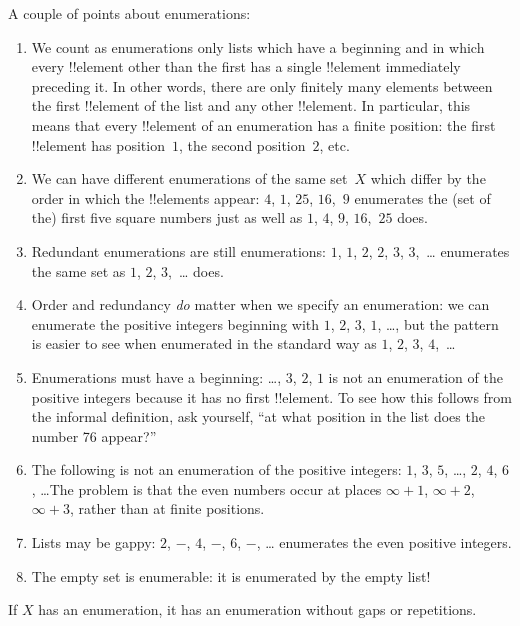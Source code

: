 \documentclass[../../../include/open-logic-section]{subfiles}
\begin{document}
\begin{explain}
A couple of points about enumerations:
\begin{enumerate}
\item We count as enumerations only lists which have a beginning and
  in which every !!{element} other than the first has a single
  !!{element} immediately preceding it.  In other words, there are
  only finitely many elements between the first !!{element} of the
  list and any other !!{element}. In particular, this means that every
  !!{element} of an enumeration has a finite position: the first
  !!{element} has position~$1$, the second position~$2$, etc.
\item We can have different enumerations of the same set~$X$ which
  differ by the order in which the !!{element}s appear: $4$, $1$,
  $25$, $16$,~$9$ enumerates the (set of the) first five square
  numbers just as well as $1$, $4$, $9$, $16$,~$25$ does.
\item Redundant enumerations are still enumerations: $1$, $1$, $2$,
  $2$, $3$, $3$,~\dots{} enumerates the same set as $1$, $2$,
  $3$,~\dots{} does.
\item Order and redundancy \emph{do} matter when we specify an
  enumeration: we can enumerate the positive integers beginning with
  $1$, $2$, $3$, $1$, \dots{}, but the pattern is easier to see when
  enumerated in the standard way as $1$, $2$, $3$, $4$,~\dots
\item Enumerations must have a beginning: \dots, $3$, $2$, $1$ is not
  an enumeration of the positive integers because it has no first
  !!{element}. To see how this follows from the informal definition,
  ask yourself, ``at what position in the list does the number 76
  appear?''
\item The following is not an enumeration of the positive integers:
  $1$, $3$, $5$, \dots, $2$, $4$, $6$, \dots\@ The problem is that the
  even numbers occur at places $\infty + 1$, $\infty + 2$, $\infty +
  3$, rather than at finite positions.
\item Lists may be gappy: $2$, $-$, $4$, $-$, $6$, $-$, \dots{}
  enumerates the even positive integers.
\item The empty set is enumerable: it is enumerated by the empty list!{}
\end{enumerate}
\end{explain}

\begin{prop}
  If $X$ has an enumeration, it has an enumeration without gaps or
  repetitions.
\end{prop}
\end{document}
